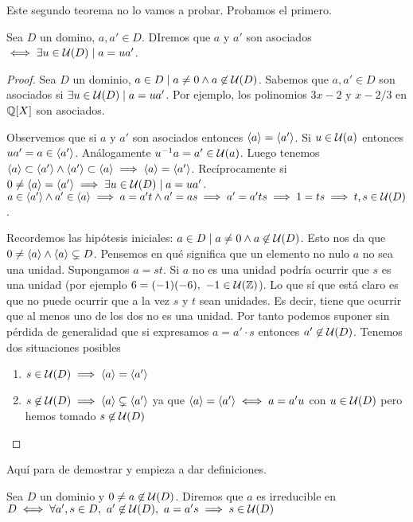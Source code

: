 Este segundo teorema no lo vamos a probar. Probamos el primero.

\begin{dfn}[Asociados]
	Sea $D$ un domino, $a,a' \in D$. DIremos que $a$ y $a'$ son asociados $\iff \exists u \in \mathcal{U}(D) \mid a = u a'$.
\end{dfn}

\begin{proof}
	Sea $D$ un dominio, $a \in D \mid a \neq 0 \land a \not\in \mathcal{U}(D)$. Sabemos que $a, a' \in D$ son asociados si $\exists u \in \mathcal{U}(D) \mid a = ua'$. Por ejemplo, los polinomios $3x-2$ y $x - 2/3$ en $\mathbb{Q}[X]$ son asociados.
	
	Observemos que si $a$ y $a'$ son asociados entonces $\langle a\rangle = \langle a'\rangle$. Si $u \in \mathcal{U}(a)$ entonces $ua' = a \in \langle a'\rangle$. Análogamente $u^{-1}a = a' \in \mathcal{U}(a)$. Luego tenemos $\langle a\rangle \subset \langle a'\rangle \land \langle a'\rangle \subset \langle a\rangle \implies \langle a\rangle = \langle a'\rangle$. Recíprocamente si $0 \neq \langle a\rangle = \langle a'\rangle \implies \exists u \in \mathcal{U}(D) \mid a = ua'$. $a \in \langle a'\rangle \land a' \in \langle a\rangle \implies a = a't \land a' = as \implies a' = a'ts \implies 1 = ts \implies t,s \in \mathcal{U}(D)$.
	
	Recordemos las hipótesis iniciales: $a \in D \mid a \neq 0 \land a \not\in \mathcal{U}(D)$. Esto nos da que $0 \neq \langle a\rangle \land \langle a\rangle \subsetneq D$. Pensemos en qué significa que un elemento no nulo $a$ no sea una unidad. Supongamos $a = st$. Si $a$ no es una unidad podría ocurrir que $s$ es una unidad (por ejemplo $6 = (-1)(-6),\ -1 \in \mathcal{U}(\mathbb{Z})$). Lo que sí que está claro es que no puede ocurrir que a la vez $s$ y $t$ sean unidades. Es decir, tiene que ocurrir que al menos uno de los dos no es una unidad. Por tanto podemos suponer sin pérdida de generalidad que si expresamos $a = a' \cdot s$  entonces $a' \not \in \mathcal{U}(D)$. Tenemos dos situaciones posibles
	\begin{enumerate}
		\item $s \in \mathcal{U}(D) \implies \langle a\rangle = \langle a'\rangle$
		\item $s \not \in \mathcal{U}(D) \implies \langle a\rangle \subsetneq \langle a'\rangle$ ya que $\langle a\rangle = \langle a'\rangle \iff a = a'u$ con $u \in \mathcal{U}(D)$ pero hemos tomado $s \not\in \mathcal{U}(D)$
	\end{enumerate}
\end{proof}

Aquí para de demostrar y empieza a dar definiciones.

\begin{dfn}
	Sea $D$ un dominio y $0 \neq a \not\in \mathcal{U}(D)$. Diremos que $a$ es irreducible en $D \iff \forall a',s \in D,\ a' \not \in \uds{D},\ a = a's \implies s \in \uds{D}$
\end{dfn}

